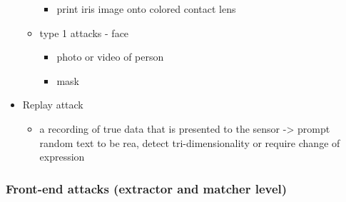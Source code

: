 \documentclass[paper=a4, fontsize=11pt]{scrartcl} %
\numberwithin{equation}{section} %
\numberwithin{figure}{section} %
\numberwithin{table}{section} %
\begin{document}
\begin{itemize}
\begin{itemize}
\begin{itemize}
\item print iris image onto colored contact lens
\end{itemize}
\item type 1 attacks - face
\begin{itemize}
\item photo or video of person
\item mask
\end{itemize}
\end{itemize}
\item Replay attack
\begin{itemize}
\item a recording of true data that is presented to the sensor -> prompt random text to be rea, detect tri-dimensionality or require change of expression
\end{itemize}
\end{itemize}

\subsubsection{Front-end attacks (extractor and matcher level)}
\end{document}
